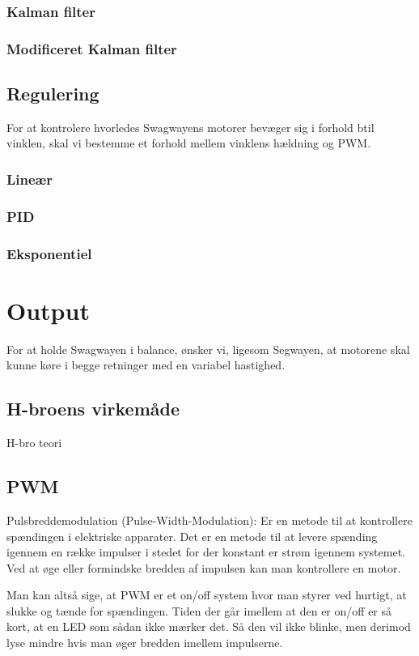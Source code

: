 \documentclass[a4paper,oneside,article,danish,table]{memoir}
\begin{document}
\subsection{Kalman filter}
\subsection{Modificeret Kalman filter}

\section{Regulering}
For at kontrolere hvorledes Swagwayens motorer bevæger sig i forhold btil vinklen, skal vi bestemme et forhold mellem vinklens hældning og PWM. 
\subsection{Lineær}
\subsection{PID}
\subsection{Eksponentiel}

\chapter{Output}
For at holde Swagwayen i balance, ønsker vi, ligesom Segwayen, at motorene skal kunne køre i begge retninger med en variabel hastighed.
\section{H-broens virkemåde}
H-bro teori
\section{PWM}
Pulsbreddemodulation (Pulse-Width-Modulation): Er en metode til at kontrollere spændingen i elektriske
apparater. Det er en metode til at levere spænding igennem en række impulser i stedet for der konstant er strøm igennem systemet. Ved at øge eller formindske bredden af impulsen kan man kontrollere en motor.

Man kan altså sige, at PWM er et on/off system hvor man styrer ved hurtigt, at slukke og tænde for
spændingen. Tiden der går imellem at den er on/off er så kort, at en LED som sådan ikke mærker det. Så
den vil ikke blinke, men derimod lyse mindre hvis man øger bredden imellem impulserne.
\end{document}
